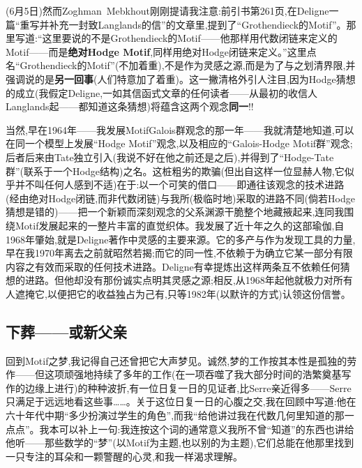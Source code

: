 
(6月5日)然而Zoghman~Mebkhout刚刚提请我注意:前引书第261页,在Deligne一篇“重写并补充一封致Langlands的信”的文章里,提到了“Grothendieck的Motif”。那里写道:“这里要说的不是Grothendieck的Motif——他那样用代数闭链来定义的Motif——而是\textbf{绝对Hodge Motif},同样用绝对Hodge闭链来定义。”这里点名“Grothendieck的Motif”(不加着重),不是作为灵感之源,而是为了与之划清界限,并强调说的是\textbf{另一回事}(人们特意加了着重)。这一撇清格外引人注目,因为Hodge猜想的成立(我假定Deligne,一如其信函式文章的任何读者——从最初的收信人Langlands起——都知道这条猜想)将蕴含这两个观念\textbf{同一}!!

当然,早在1964年——我发展MotifGalois群观念的那一年——我就清楚地知道,可以在同一个模型上发展“Hodge Motif”观念,以及相应的“Galois-Hodge Motif群”观念;后者后来由Tate独立引入(我说不好在他之前还是之后),并得到了“Hodge-Tate群”(联系于一个Hodge结构)之名。这桩粗劣的欺骗(但出自这样一位显赫人物,它似乎并不叫任何人感到不适)在于:以一个可笑的借口——即通往该观念的技术进路(经由绝对Hodge闭链,而非代数闭链)与我所(极临时地)采取的进路不同(倘若Hodge猜想是错的)——把一个新颖而深刻观念的父系渊源干脆整个地藏掖起来,连同我围绕Motif发展起来的一整片丰富的直觉织体。我发展了近十年之久的这部瑜伽\dmark{},自1968年肇始,就是Deligne著作中灵感的主要来源。它的多产与作为发现工具的力量,早在我1970年离去之前就昭然若揭;而它的同一性,不依赖于为确立它某一部分有限内容之有效而采取的任何技术进路。Deligne有幸提炼出这样两条互不依赖任何猜想的进路。但他却没有那份诚实点明其灵感之源;相反,从1968年起他就极力对所有人遮掩它,以便把它的收益独占为己有,只等1982年(以默许的方式)认领这份信誉。

\subsection{下葬——或新父亲}


回到Motif之梦,我记得自己还曾把它大声梦见。诚然,梦的工作按其本性是孤独的劳作——但这项顽强地持续了多年的工作(在一项吞噬了我大部分时间的浩繁奠基写作的边缘上进行)的种种波折,有一位日复一日的见证者,比Serre亲近得多——Serre只满足于远远地看这些事……。关于这位日复一日的心腹之交,我在回顾中写道:他在六十年代中期“多少扮演过学生的角色”,而我“给他讲过我在代数几何里知道的那一点点”。我本可以补上一句:我连按这个词的通常意义我所不曾“知道”的东西也讲给他听——那些数学的“梦”(以Motif为主题,也以别的为主题),它们总能在他那里找到一只专注的耳朵和一颗警醒的心灵,和我一样渴求理解。

